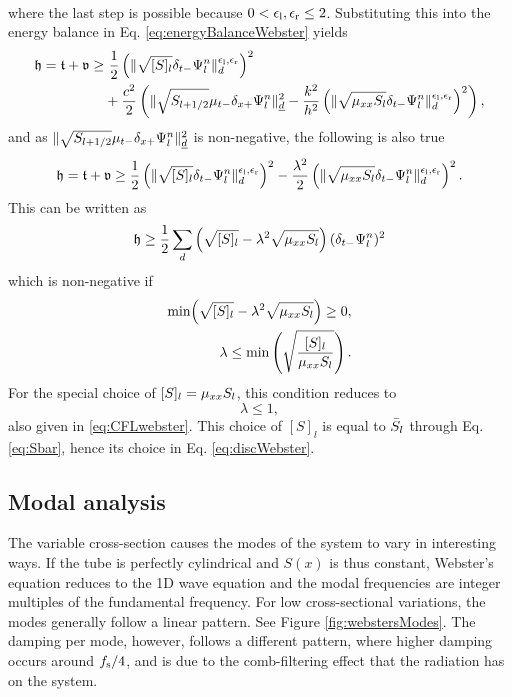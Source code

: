 {\begin{align*}
\end{align*}
where the last step is possible because $0 < \epsilon_\text{l}, \epsilon_\text{r} \leq 2$.
Substituting this into the energy balance in Eq. \eqref{eq:energyBalanceWebster} yields
\begin{align*}
    \mathfrak{h} = \mathfrak{t} + \mathfrak{v} \geq &\  \frac{1}{2} \left(\lVert\sqrt{[S]_l} \delta_{t-} \Psi_l^n \rVert_d^{\epsilon_\text{l}, \epsilon_\text{r}}\right)^2 \\
    &+ \frac{c^2}{2}\left(\lVert\sqrt{S_{l+1/2}}\mu_{t-}\delta_{x+}\Psi_l^n\rVert_{\underline{d}}^2 - \frac{k^2}{h^2}\left(\lVert\sqrt{\mu_{xx} S_l}\delta_{t-}\Psi_l^n\rVert_{d}^{\epsilon_\text{l},\epsilon_\text{r}}\right)^2\right),
\end{align*}
and as $\lVert\sqrt{S_{l+1/2}}\mu_{t-}\delta_{x+}\Psi_l^n\rVert_{\underline{d}}^2$ is non-negative, the following is also true
\begin{equation*}
    \mathfrak{h} = \mathfrak{t} + \mathfrak{v} \geq \frac{1}{2} \left(\lVert\sqrt{[S]_l} \delta_{t-} \Psi_l^n \rVert_d^{\epsilon_\text{l}, \epsilon_\text{r}}\right)^2- \frac{\lambda^2}{2}\left(\lVert\sqrt{\mu_{xx} S_l}\delta_{t-}\Psi_l^n\rVert_{d}^{\epsilon_\text{l},\epsilon_\text{r}}\right)^2.
\end{equation*}
This can be written as
\begin{equation}
    \mathfrak{h} \geq \frac{1}{2} \sum_d \left(\sqrt{[S]_l} - \lambda^2\sqrt{\mu_{xx} S_l}\right)(\delta_{t-} \Psi_l^n)^2 
\end{equation}
which is non-negative if
\begin{align*}
    \text{min}\Big(\sqrt{[S]_l} - \lambda^2\sqrt{\mu_{xx} S_l}\Big) \geq 0,\\
    \lambda \leq \text{min}\left(\sqrt{\frac{[S]_l}{\mu_{xx} S_l}}\right).
\end{align*}
For the special choice of $[S]_l = \mu_{xx} S_l$, this condition reduces to
\begin{equation}
    \lambda \leq 1,
\end{equation}
also given in \eqref{eq:CFLwebster}. This choice of $[S]_l$ is equal to $\bar{S}_l$ through Eq. \eqref{eq:Sbar}, hence its choice in Eq. \eqref{eq:discWebster}.

\subsection{Modal analysis}
The variable cross-section causes the modes of the system to vary in interesting ways. If the tube is perfectly cylindrical and $S(x)$ is thus constant, Webster's equation reduces to the 1D wave equation and the modal frequencies are integer multiples of the fundamental frequency. 
For low cross-sectional variations, the modes generally follow a linear pattern. See Figure \ref{fig:webstersModes}. The damping per mode, however, follows a different pattern, where higher damping occurs around $f_\text{s}/4$, and is due to the comb-filtering effect that the radiation has on the system. 

}
